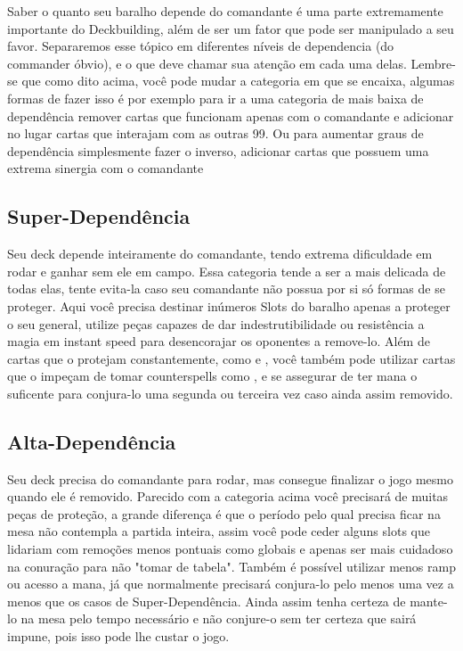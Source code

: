Saber o quanto seu baralho depende do comandante é uma parte extremamente importante do Deckbuilding, além de ser um fator que pode ser manipulado a seu favor.
Separaremos esse tópico em diferentes níveis de dependencia (do commander óbvio), e o que deve chamar sua atenção em cada uma delas.
Lembre-se que como dito acima, você pode mudar a categoria em que se encaixa, algumas formas de fazer isso é por exemplo para ir a uma categoria de mais baixa de dependência remover cartas que funcionam apenas com o comandante e adicionar no lugar cartas que interajam com as outras 99.
Ou para aumentar graus de dependência simplesmente fazer o inverso, adicionar cartas que possuem uma extrema sinergia com o comandante



\subsection{Super-Dependência}
Seu deck depende inteiramente do comandante, tendo extrema dificuldade em rodar e ganhar sem ele em campo.
Essa categoria tende a ser a mais delicada de todas elas, tente evita-la caso seu comandante não possua por si só formas de se proteger.
Aqui você precisa destinar inúmeros Slots do baralho apenas a proteger o seu general, utilize peças capazes de dar indestrutibilidade ou resistência a magia em instant speed para desencorajar os oponentes a remove-lo.
Além de cartas que o protejam constantemente, como  e , você também pode utilizar cartas que o impeçam de tomar counterspells como , e se assegurar de ter mana o suficente para conjura-lo uma segunda ou terceira vez caso ainda assim removido.


\subsection{Alta-Dependência}
Seu deck precisa do comandante para rodar, mas consegue finalizar o jogo mesmo quando ele é removido.
Parecido com a categoria acima você precisará de muitas peças de proteção, a grande diferença é que o período pelo qual precisa ficar na mesa não contempla a partida inteira, assim você pode ceder alguns slots que lidariam com remoções menos pontuais como globais e apenas ser mais cuidadoso na conuração para não "tomar de tabela".
Também é possível utilizar menos ramp ou acesso a mana, já que normalmente precisará conjura-lo pelo menos uma vez a menos que os casos de Super-Dependência.
Ainda assim tenha certeza de mante-lo na mesa pelo tempo necessário e não conjure-o sem ter certeza que sairá impune, pois isso pode lhe custar o jogo.



